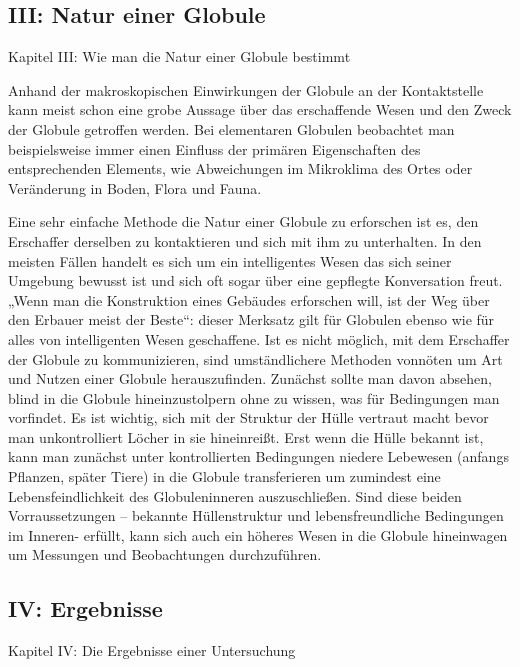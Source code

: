 \documentclass[a5paper,8pt]{book}
\begin{document}
\newpage

\subsection {III: Natur einer Globule}

Kapitel III: Wie man die Natur einer Globule bestimmt

Anhand der makroskopischen Einwirkungen der Globule an der Kontaktstelle kann meist schon eine grobe Aussage über das 
erschaffende Wesen und den Zweck der Globule getroffen werden. Bei elementaren Globulen beobachtet man beispielsweise 
immer einen Einfluss der primären Eigenschaften des entsprechenden Elements, wie Abweichungen im Mikroklima des Ortes oder 
Veränderung in Boden, Flora und Fauna. 

Eine sehr einfache Methode die Natur einer Globule zu erforschen ist es, den Erschaffer derselben zu kontaktieren und sich
mit ihm zu unterhalten. In den meisten Fällen handelt es sich um ein intelligentes Wesen das sich seiner Umgebung bewusst 
ist und sich oft sogar über eine gepflegte Konversation freut. „Wenn man die Konstruktion eines Gebäudes erforschen will, 
ist der Weg über den Erbauer meist der Beste“: dieser Merksatz gilt für Globulen ebenso wie für alles von intelligenten 
Wesen geschaffene. 
Ist es nicht möglich, mit dem Erschaffer der Globule zu kommunizieren, sind umständlichere Methoden vonnöten um Art und 
Nutzen einer Globule herauszufinden. Zunächst sollte man davon absehen, blind in die Globule hineinzustolpern ohne zu 
wissen, was für Bedingungen man vorfindet. Es ist wichtig, sich mit der Struktur der Hülle vertraut macht bevor man 
unkontrolliert Löcher in sie hineinreißt. Erst wenn die Hülle bekannt ist, kann man zunächst unter kontrollierten 
Bedingungen niedere Lebewesen (anfangs Pflanzen, später Tiere) in die Globule transferieren um zumindest eine 
Lebensfeindlichkeit des Globuleninneren auszuschließen. Sind diese beiden Vorraussetzungen – bekannte Hüllenstruktur und 
lebensfreundliche Bedingungen im Inneren-  erfüllt, kann sich auch ein höheres Wesen in die Globule hineinwagen um 
Messungen und Beobachtungen durchzuführen. 

\newpage

\subsection{IV: Ergebnisse}

Kapitel IV: Die Ergebnisse einer Untersuchung 
\end{document}
